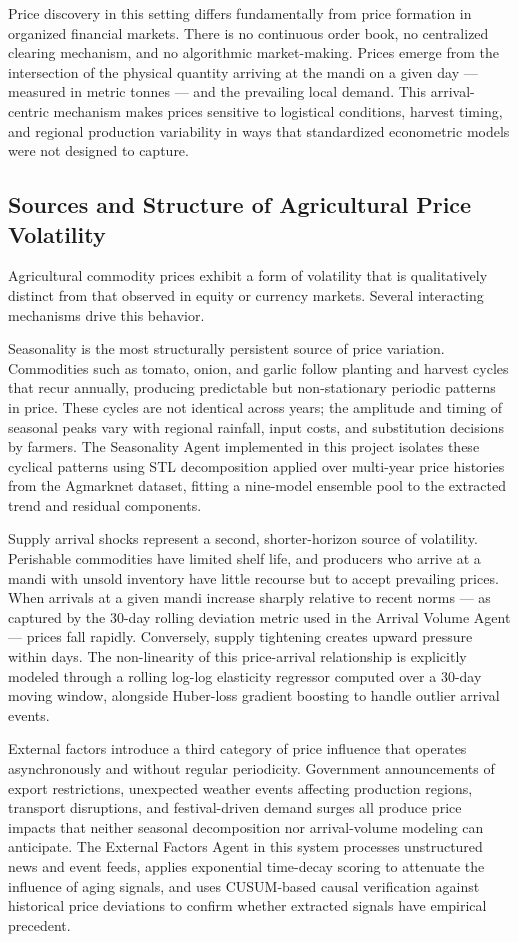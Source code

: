 \documentclass[12pt,a4paper]{report}
\begin{document}
Price discovery in this setting differs fundamentally from price formation in organized financial markets. There is no continuous order book, no centralized clearing mechanism, and no algorithmic market-making. Prices emerge from the intersection of the physical quantity arriving at the mandi on a given day — measured in metric tonnes — and the prevailing local demand. This arrival-centric mechanism makes prices sensitive to logistical conditions, harvest timing, and regional production variability in ways that standardized econometric models were not designed to capture.

\subsection{Sources and Structure of Agricultural Price Volatility}

Agricultural commodity prices exhibit a form of volatility that is qualitatively distinct from that observed in equity or currency markets. Several interacting mechanisms drive this behavior.

Seasonality is the most structurally persistent source of price variation. Commodities such as tomato, onion, and garlic follow planting and harvest cycles that recur annually, producing predictable but non-stationary periodic patterns in price. These cycles are not identical across years; the amplitude and timing of seasonal peaks vary with regional rainfall, input costs, and substitution decisions by farmers. The Seasonality Agent implemented in this project isolates these cyclical patterns using STL decomposition applied over multi-year price histories from the Agmarknet dataset, fitting a nine-model ensemble pool to the extracted trend and residual components.

Supply arrival shocks represent a second, shorter-horizon source of volatility. Perishable commodities have limited shelf life, and producers who arrive at a mandi with unsold inventory have little recourse but to accept prevailing prices. When arrivals at a given mandi increase sharply relative to recent norms — as captured by the 30-day rolling deviation metric used in the Arrival Volume Agent — prices fall rapidly. Conversely, supply tightening creates upward pressure within days. The non-linearity of this price-arrival relationship is explicitly modeled through a rolling log-log elasticity regressor computed over a 30-day moving window, alongside Huber-loss gradient boosting to handle outlier arrival events.

External factors introduce a third category of price influence that operates asynchronously and without regular periodicity. Government announcements of export restrictions, unexpected weather events affecting production regions, transport disruptions, and festival-driven demand surges all produce price impacts that neither seasonal decomposition nor arrival-volume modeling can anticipate. The External Factors Agent in this system processes unstructured news and event feeds, applies exponential time-decay scoring to attenuate the influence of aging signals, and uses CUSUM-based causal verification against historical price deviations to confirm whether extracted signals have empirical precedent.
\end{document}
